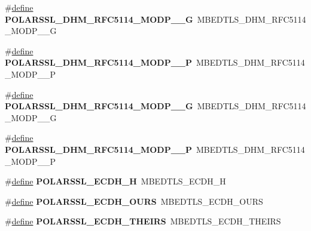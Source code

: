 \begin{DoxyCompactItemize}
\item 
\mbox{\label{compat-1_83_8h_aee8dd3aaa038de9299e4228c461dd7d0}} 
\#\hyperlink{structdefine}{define} {\bfseries P\+O\+L\+A\+R\+S\+S\+L\+\_\+\+D\+H\+M\+\_\+\+R\+F\+C5114\+\_\+\+M\+O\+D\+P\+\_\+\_\+G}~M\+B\+E\+D\+T\+L\+S\+\_\+\+D\+H\+M\+\_\+\+R\+F\+C5114\+\_\+\+M\+O\+D\+P\+\_\+\_\+G
\item 
\mbox{\label{compat-1_83_8h_a0248d4be4b217add62ee524094320f26}} 
\#\hyperlink{structdefine}{define} {\bfseries P\+O\+L\+A\+R\+S\+S\+L\+\_\+\+D\+H\+M\+\_\+\+R\+F\+C5114\+\_\+\+M\+O\+D\+P\+\_\+\_\+P}~M\+B\+E\+D\+T\+L\+S\+\_\+\+D\+H\+M\+\_\+\+R\+F\+C5114\+\_\+\+M\+O\+D\+P\+\_\+\_\+P
\item 
\mbox{\label{compat-1_83_8h_a404a263e2f02952ab26ce71de5770d86}} 
\#\hyperlink{structdefine}{define} {\bfseries P\+O\+L\+A\+R\+S\+S\+L\+\_\+\+D\+H\+M\+\_\+\+R\+F\+C5114\+\_\+\+M\+O\+D\+P\+\_\+\_\+G}~M\+B\+E\+D\+T\+L\+S\+\_\+\+D\+H\+M\+\_\+\+R\+F\+C5114\+\_\+\+M\+O\+D\+P\+\_\+\_\+G
\item 
\mbox{\label{compat-1_83_8h_ad57332be7b632e9ddd678a4cc0750b91}} 
\#\hyperlink{structdefine}{define} {\bfseries P\+O\+L\+A\+R\+S\+S\+L\+\_\+\+D\+H\+M\+\_\+\+R\+F\+C5114\+\_\+\+M\+O\+D\+P\+\_\+\_\+P}~M\+B\+E\+D\+T\+L\+S\+\_\+\+D\+H\+M\+\_\+\+R\+F\+C5114\+\_\+\+M\+O\+D\+P\+\_\+\_\+P
\item 
\mbox{\label{compat-1_83_8h_a899a7dad06e98f5d3f3617343f096cac}} 
\#\hyperlink{structdefine}{define} {\bfseries P\+O\+L\+A\+R\+S\+S\+L\+\_\+\+E\+C\+D\+H\+\_\+H}~M\+B\+E\+D\+T\+L\+S\+\_\+\+E\+C\+D\+H\+\_\+H
\item 
\mbox{\label{compat-1_83_8h_a79e7a235ff6be6614a81eb2cd670df81}} 
\#\hyperlink{structdefine}{define} {\bfseries P\+O\+L\+A\+R\+S\+S\+L\+\_\+\+E\+C\+D\+H\+\_\+\+O\+U\+RS}~M\+B\+E\+D\+T\+L\+S\+\_\+\+E\+C\+D\+H\+\_\+\+O\+U\+RS
\item 
\mbox{\label{compat-1_83_8h_a2876ce805a250c47b563370cb79e390e}} 
\#\hyperlink{structdefine}{define} {\bfseries P\+O\+L\+A\+R\+S\+S\+L\+\_\+\+E\+C\+D\+H\+\_\+\+T\+H\+E\+I\+RS}~M\+B\+E\+D\+T\+L\+S\+\_\+\+E\+C\+D\+H\+\_\+\+T\+H\+E\+I\+RS
\item 

\end{DoxyCompactItemize}
